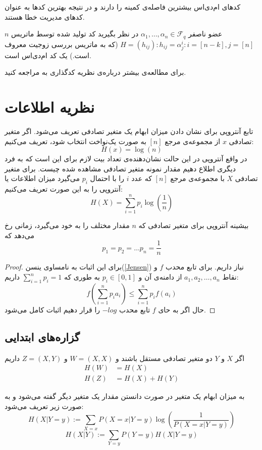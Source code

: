 کدهای ام‌دی‌اس بیشترین فاصله‌ی کمینه را دارند و در نتیجه بهترین کدها به عنوان کدهای مدیریت خطا هستند.
\begin{example}
	$n$
	عضو ناصفر
	$\alpha_1, \ldots, \alpha_n \in \mathcal{F}_q$
	در نظر بگیرید کد تولید شده توسط ماتریس 
	$H = (h_{ij}): h_{ij} = \alpha_j^i: i = [n - k], j = [n]$
	(که به ماتریس بررسی زوجیت معروف است.)	یک کد ام‌دی‌اس است.
\end{example}

	برای مطالعه‌ی بیشتر درباره‌ی نظریه کدگذاری به
\cite{book:coding}
مراجعه کنید.
\section{نظریه اطلاعات}
تابع آنتروپی برای نشان دادن میزان ابهام یک متغیر تصادفی تعریف می‌شود. اگر متغیر تصادفی
$x$
از مجموعه‌ی مرجع
$[n]$
به صورت یک‌نواخت انتخاب شود، تعریف می‌کنیم:
$$H(x) = \log(n)$$
در واقع آنتروپی در این حالت نشان‌دهنده‌ی تعداد بیت لازم برای این است که به فرد دیگری اطلاع دهیم مقدار نمونه متغیر تصادفی مشاهده شده چیست. برای متغیر تصادفی
$X$
با مجموعه‌ی مرجع
$[n]$
که عدد
$i$
را با احتمال
$p_i$
می‌گیرد میزان اطلاعات یا آنتروپی را به این صورت تعریف می‌کنیم:
$$H(X) = \sum_{i = 1}^{n} p_i \log(\frac{1}{n})$$

\begin{theorem}
بیشینه آنتروپی برای متغیر تصادفی که
$n$
مقدار مختلف را به خود می‌گیرد، زمانی رخ می‌دهد که
$$p_1 = p_2 = \dots p_n = \frac{1}{n}$$
\end{theorem}
\begin{proof}
برای این اثبات به نامساوی ینسن(\autoref{Jensen})
 نیاز داریم. برای تابع محدب
$f$
و نقاط
$a_1, a_2, \dots, a_n$
از دامنه‌ی آن و
$p_i \in [0, 1]$
به طوری که
$\sum_{i = 1}^{n} p_i = 1$
داریم:
$$f(\sum_{i = 1}^{n} p_i a_i) \leq \sum_{i = 1}^{n} p_i f(a_i)$$
حال اگر به حای
$f$
تابع محدب
$- log$
را قرار دهیم اثبات کامل می‌شود.
\end{proof}

\subsection{گزاره‌های ابتدایی}
\begin{theorem}
اگر
$X$
و
$Y$
دو متغیر تصادفی مستقل باشند و
$W = (X, X)$
و
$Z = (X, Y)$
داریم
\begin{align*}
    H(W) &= H(X) \\
    H(Z) &= H(X) + H(Y)
\end{align*}
\end{theorem}
\begin{definition}
	به میزان ابهام یک متغیر در صورت دانستن مقدار یک متغیر دیگر گفته می‌شود و به صورت زیر تعریف می‌شود:
$$H(X | Y = y) := \sum_{X = x} P(X = x| Y = y) \log(\frac{1}{P(X = x| Y = y)})$$
$$H(X|Y) := \sum_{Y = y} P(Y = y) H(X | Y = y)$$
\end{definition}

